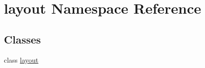 \hypertarget{namespacelayout}{}\section{layout Namespace Reference}
\label{namespacelayout}
\subsection*{Classes}
\begin{DoxyCompactItemize}
\item 
class \hyperlink{classlayout_1_1layout}{layout}
\end{DoxyCompactItemize}
